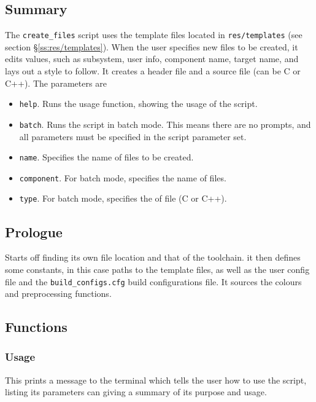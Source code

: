 \documentclass[a4paper, oneside, 11pt, titlepage, onecolumn, openright]{report}
\begin{document}
\subsection{Summary}
			\label{ss:crefileSummary}
			The \texttt{create\_files} script uses the template files located in \texttt{res/templates} (see section \S\ref{ss:res/templates}). When the user specifies new files to be created, it edits values, such as subsystem, user info, component name, target name, and lays out a style to follow. It creates a header file and a source file (can be C or C++).
			The parameters are
			
\begin{itemize}
\item \texttt{help}. Runs the usage function, showing the usage of the script.
\item \texttt{batch}. Runs the script in batch mode. This means there are no prompts, and all parameters must be specified in the script parameter set.
\item \texttt{name}. Specifies the name of files to be created.
\item \texttt{component}. For batch mode, specifies the name of files.
\item \texttt{type}. For batch mode, specifies the of file (C or C++).
\end{itemize}
			
\subsection{Prologue}
			\label{ss:crefilePrologue}
			Starts off finding its own file location and that of the toolchain. it then defines some constants, in this case paths to the template files, as well as the user config file and the \texttt{build\_configs.cfg} build configurations file. It sources the colours and preprocessing functions.
			
\subsection{Functions}
			\label{ss:crefileFunctions}
			
\subsubsection{Usage}
			\label{sss:crefileUsage}
			This prints a message to the terminal which tells the user how to use the script, listing its parameters can giving a summary of its purpose and usage.
			
\end{document}
